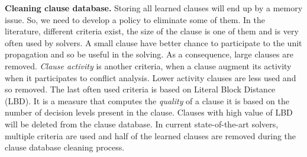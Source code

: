 \textbf{Cleaning clause database.}
Storing  all learned clauses will end up by a memory issue. So, we need to develop a policy to eliminate
some of them. In the literature, different criteria exist,
 the size of the clause is one of them and is very often used by solvers. 
 A small clause have better chance to participate to the unit propagation and so be useful in the solving.
 As a consequence, large clauses are removed.
\emph{Clause activity} is another criteria, when a clause augment its activity when it participates to conflict analysis. Lower activity clauses are less used and so removed.
 The last often used criteria is based on Literal Block Distance (LBD). It is a measure that computes the \emph{quality} of a clause it is based on the number of decision levels present in the clause. Clauses with high value of LBD will be deleted from the clause database.
In current state-of-the-art solvers, multiple criteria are used and half of the learned clauses are removed during the clause database cleaning process.
